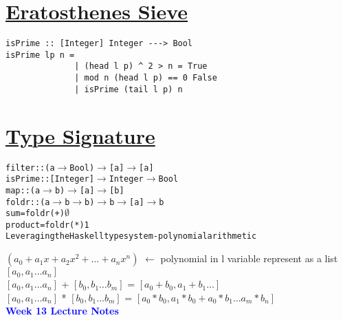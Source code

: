 \documentclass{article}
\begin{document}
\begin{flushleft}
\begin{flushleft}
\begin{flushleft}
\section*{\underline{Eratosthenes Sieve}}
\begin{verbatim}
isPrime :: [Integer] Integer ---> Bool
isPrime lp n =
              | (head l p) ^ 2 > n = True
              | mod n (head l p) == 0 False
              | isPrime (tail l p) n
\end{verbatim}
\vspace*{0.5cm}

\section*{\underline{Type Signature}}
\begin{flushleft}
\begin{alltt}
filter :: (a \(\rightarrow\) Bool) \(\rightarrow\) [a] \(\rightarrow\) [a] \\
isPrime :: [Integer] \(\rightarrow\) Integer \(\rightarrow\) Bool\\
map :: (a \(\rightarrow\) b) \(\rightarrow\) [a] \(\rightarrow\) [b] \\
foldr :: (a \(\rightarrow\) b \(\rightarrow\) b) \(\rightarrow\) b \(\rightarrow\) [a] \(\rightarrow\) b \\
sum = foldr (+) \(\emptyset\)
product = foldr (*) 1 \\
Leveraging the Haskell type system - polynomial arithmetic
\end{alltt}
\bigskip
$ ({a}_{0} + {a}_{1}x + {a}_{2}{x}^{2} + \ldots + {a}_{n}{x}^{n})$ $\leftarrow$ polynomial in l variable represent as a list $[{a}_{0}, {a}_{1} \ldots {a}_{n}]$\\
\bigskip
$[{a}_{0}, {a}_{1} \ldots {a}_{n}]$ + $[{b}_{0}, {b}_{1} \ldots {b}_{m}]$ = $[{a}_{0} + {b}_{0}, {a}_{1} + {b}_{1} \ldots]$\\
\bigskip
$[{a}_{0}, {a}_{1} \ldots {a}_{n}]$ * $[{b}_{0}, {b}_{1} \ldots {b}_{m}]$ = $[{a}_{0} * {b}_{0}, {a}_{1} * {b}_{0} + {a}_{0} * {b}_{1} \ldots {a}_{m} * {b}_{n}]$\\
\pagebreak
\textcolor{blue}{\textbf{{\huge Week 13 Lecture Notes}}}

\end{flushleft}
\end{flushleft}
\end{flushleft}
\end{flushleft}
\end{document}
